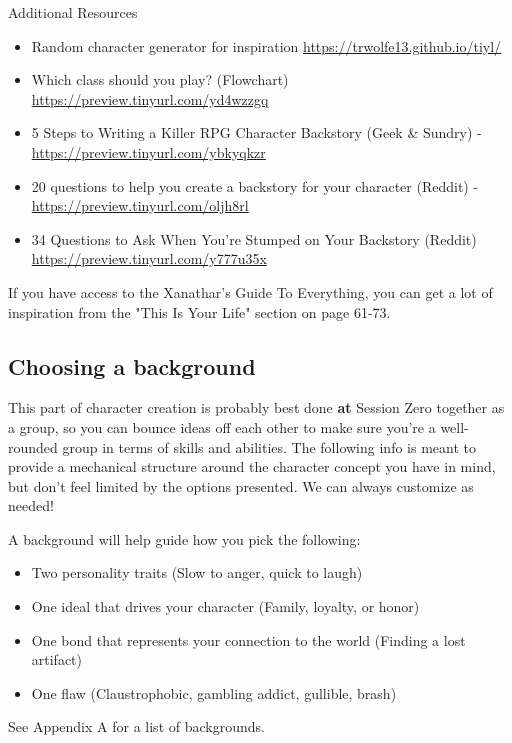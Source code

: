 \documentclass[10pt,twoside,twocolumn,openany,bg=print]{dndbook}
\begin{document}
\begin{paperbox}[float=!t]{Additional Resources}
\begin{itemize}
    \item Random character generator for inspiration \url{https://trwolfe13.github.io/tiyl/}
    \item Which class should you play? (Flowchart) \url{https://preview.tinyurl.com/yd4wzzgq}
    \item 5 Steps to Writing a Killer RPG Character Backstory (Geek \& Sundry) - \url{https://preview.tinyurl.com/ybkyqkzr}
    \item 20 questions to help you create a backstory for your character (Reddit) - \url{https://preview.tinyurl.com/oljh8rl}
    \item 34 Questions to Ask When You're Stumped on Your Backstory (Reddit) \url{https://preview.tinyurl.com/y777u35x}
\end{itemize}
\end{paperbox}

\begin{quotebox}
If you have access to the Xanathar's Guide To Everything, you can get a lot of inspiration from the "This Is Your Life" section on page 61-73.
\end{quotebox}

\subsection{Choosing a background}

This part of character creation is probably best done \textbf{at} Session Zero together as a group, so you can bounce ideas off each other to make sure you’re a well-rounded group in terms of skills and abilities. The following info is meant to provide a mechanical structure around the character concept you have in mind, but don’t feel limited by the options presented. We can always customize as needed!

A background will help guide how you pick the following:
\begin{itemize}
\item Two personality traits (Slow to anger, quick to laugh)
\item One ideal that drives your character (Family, loyalty, or honor)
\item One bond that represents your connection to the world (Finding a lost artifact)
\item One flaw (Claustrophobic, gambling addict, gullible, brash)
\end{itemize}
See Appendix A for a list of backgrounds.
\end{document}
